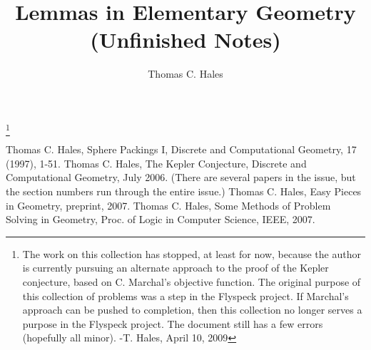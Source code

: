 \documentclass[11pt]{amsart}
\title{Lemmas in Elementary Geometry\\(Unfinished Notes)}
\author{Thomas C. Hales}
\begin{document}
\maketitle

\symbolfootnote[0]{\svninfo\hfil\break}
\footnote{The work on this collection has stopped, at least for now, because the author is currently pursuing an alternate approach to the proof of the Kepler conjecture, based on C. Marchal's objective function.  The original purpose of this collection of problems was a step in the Flyspeck project.  If Marchal's approach can be pushed to completion, then this collection no longer serves a purpose in the Flyspeck project.  The document still has a few errors (hopefully all minor).   -T. Hales, April 10, 2009} %

 








\newpage
\begin{thebibliography}{CHMS94}
 Thomas C. Hales, Sphere Packings I,
    Discrete and Computational Geometry, 17 (1997), 1-51.
 Thomas C. Hales, The Kepler Conjecture, Discrete and
Computational Geometry, July 2006. (There are several papers in
the issue, but the section numbers run through the entire issue.)
 Thomas C. Hales, Easy Pieces in Geometry, preprint, 2007.
 Thomas C. Hales, Some Methods of Problem
Solving in Geometry, Proc. of Logic in Computer Science, IEEE, 2007.
\end{thebibliography}

{


}

\tableofcontents
\end{document}
